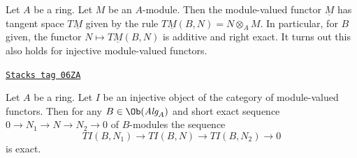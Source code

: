 Let $A$ be a ring. Let $M$ be an $A$-module. Then the module-valued functor
$\underline{M}$ has tangent space $T\underline{M}$ given by the rule
$T\underline{M}(B, N) = N \otimes_A M$. In particular, for $B$ given, the
functor $N \mapsto T\underline{M}(B, N)$ is additive and right exact. It turns
out this also holds for injective module-valued functors.

\begin{lemma}
\label{adequate-lemma-tangent-injective}
\href{https://stacks.math.columbia.edu/tag/06ZA}{\texttt{Stacks tag 06ZA}}

Let $A$ be a ring. Let $I$ be an injective object of the category
of module-valued functors. Then for any $B \in \Ob(\textit{Alg}_A)$
and short exact sequence
$0 \to N_1 \to N \to N_2 \to 0$
of $B$-modules the sequence
$$
TI(B, N_1) \to TI(B, N) \to TI(B, N_2) \to 0
$$
is exact.
\end{lemma}

